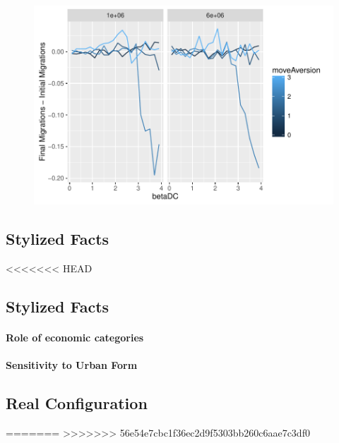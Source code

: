 \begin{figure}
\centering
\includegraphics[width=\textwidth,height=0.3\textheight]{figures/migr-diff}
\caption{}
\label{fig:migr-diff}
\end{figure}





\subsection{Stylized Facts}


<<<<<<< HEAD
\subsection{Stylized Facts}



\paragraph{Role of economic categories}



\paragraph{Sensitivity to Urban Form}







\subsection{Real Configuration}
=======
>>>>>>> 56e54e7cbc1f36ec2d9f5303bb260c6aae7c3df0


